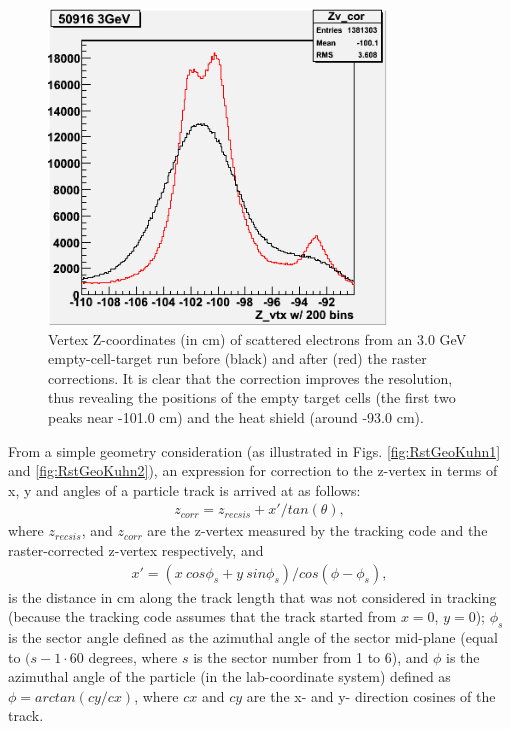 \begin{figure}[h] 
\centering
  \leavevmode \includegraphics[width=0.8\textwidth]{figuresEG4/FigKineCor/MTc3G50916one.png}   
  \caption[Vz from Empty target run]{Vertex Z-coordinates (in cm) of scattered electrons from an 3.0 GeV empty-cell-target run before (black) and after (red) the raster corrections. It is clear that the correction improves the resolution, thus revealing the positions of the empty target cells (the first two peaks near -101.0 cm) and the heat shield (around -93.0 cm).}
  \label{fig:MTcellVz1}
\end{figure}



From a simple geometry consideration (as illustrated in Figs. \ref{fig:RstGeoKuhn1} and \ref{fig:RstGeoKuhn2}), an expression for correction to the z-vertex in terms of x, y and angles of a particle track is arrived at as follows:
\begin{eqnarray}
\label{eqRC-zcor}
z_{corr} = z_{recsis} + x'/tan(\theta),
\end{eqnarray}
where $z_{recsis}$, and $z_{corr}$ are the z-vertex measured %
by the tracking code and the raster-corrected z-vertex respectively, and
\begin{eqnarray}
\label{eqRC-xprime}
x' = (x~cos\phi_s + y~sin\phi_s)/cos(\phi - \phi_s),
\end{eqnarray}
is the distance in cm along the track length that was not considered in tracking (because the tracking code assumes that the track started from $x = 0$, $y = 0$); $\phi_s$ is the sector angle defined as the azimuthal angle of the sector mid-plane (equal to $(s-1 \cdot 60$ degrees, where $s$ is the sector number from 1 to 6), and $\phi$ is the azimuthal angle of the particle (in the lab-coordinate system) defined as $\phi = arctan(cy/cx)$, %
where $cx$ and $cy$ are the x- and y- direction cosines of the track. 

